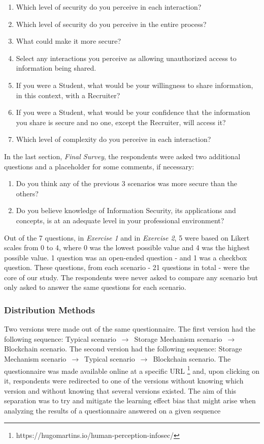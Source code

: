 \begin{enumerate}
	\item Which level of security do you perceive in each interaction?
	\item Which level of security do you perceive in the entire process?
	\item What could make it more secure?
	\item Select any interactions you perceive as allowing unauthorized access to information being shared.
	\item If you were a Student, what would be your willingness to share information, in this context, with a Recruiter?
	\item  If you were a Student, what would be your confidence that the information you share is secure and no one, except the Recruiter, will access it?
	\item Which level of complexity do you perceive in each interaction?
\end{enumerate}

In the last section, \textit{Final Survey}, the respondents were asked two additional questions and a placeholder for some comments, if necessary:

\begin{enumerate}
	\item Do you think any of the previous 3 scenarios was more secure than the others?
	\item Do you believe knowledge of Information Security, its applications and concepts, is at an adequate level in your professional environment?
\end{enumerate}

Out of the 7 questions, in \textit{Exercise 1} and in \textit{Exercise 2}, 5 were based on Likert scales from 0 to 4, where 0 was the lowest possible value and 4 was the highest possible value. 1 question was an open-ended question - and 1 was a checkbox question. These questions, from each scenario - 21 questions in total - were the core of our study. The respondents were never asked to compare any scenario but only asked to answer the same questions for each scenario.

\subsubsection{Distribution Methods}

Two versions were made out of the same questionnaire. The first version had the following sequence: Typical scenario $\,\to\,$ Storage Mechanism scenario $\,\to\,$ Blockchain scenario. The second version had the following sequence: Storage Mechanism scenario $\,\to\,$ Typical scenario $\,\to\,$ Blockchain scenario. The questionnaire was made available online at a specific URL \footnote{https://hugomartins.io/human-perception-infosec/} and, upon clicking on it, respondents were redirected to one of the versions without knowing which version and without knowing that several versions existed. The aim of this separation was to try and mitigate the learning effect bias that might arise when analyzing the results of a questionnaire answered on a given sequence

